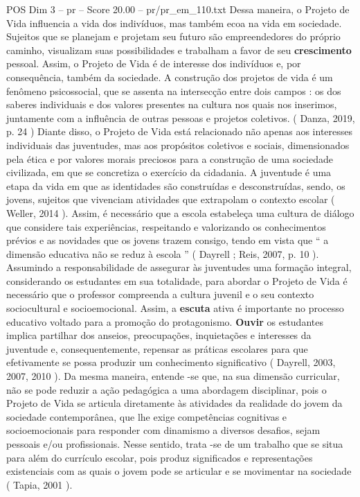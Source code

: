 \begin{textsample}{POS Dim 3 – pr – Score 20.00 – pr/pr\_em\_110.txt}
Dessa maneira, o Projeto de Vida influencia a vida dos indivíduos, mas também ecoa na vida em sociedade.
Sujeitos que se planejam e projetam seu futuro são empreendedores do próprio caminho, visualizam suas possibilidades e trabalham a favor de seu \textbf{crescimento} pessoal.
Assim, o Projeto de Vida é de interesse dos indivíduos e, por consequência, também da sociedade.
A construção dos projetos de vida é um fenômeno psicossocial, que se assenta na intersecção entre dois campos : os dos saberes individuais e dos valores presentes na cultura nos quais nos inserimos, juntamente com a influência de outras pessoas e projetos coletivos. ( Danza, 2019, p. 24 ) Diante disso, o Projeto de Vida está relacionado não apenas aos interesses individuais das juventudes, mas aos propósitos coletivos e sociais, dimensionados pela ética e por valores morais preciosos para a construção de uma sociedade civilizada, em que se concretiza o exercício da cidadania.
A juventude é uma etapa da vida em que as identidades são construídas e desconstruídas, sendo, os jovens, sujeitos que vivenciam atividades que extrapolam o contexto escolar ( Weller, 2014 ).
Assim, é necessário que a escola estabeleça uma cultura de diálogo que considere tais experiências, respeitando e valorizando os conhecimentos prévios e as novidades que os jovens trazem consigo, tendo em vista que “ a dimensão educativa não se reduz à escola ” ( Dayrell ; Reis, 2007, p. 10 ).
Assumindo a responsabilidade de assegurar às juventudes uma formação integral, considerando os estudantes em sua totalidade, para abordar o Projeto de Vida é necessário que o professor compreenda a cultura juvenil e o seu contexto sociocultural e socioemocional.
Assim, a \textbf{escuta} ativa é importante no processo educativo voltado para a promoção do protagonismo. \textbf{Ouvir} os estudantes implica partilhar dos anseios, preocupações, inquietações e interesses da juventude e, consequentemente, repensar as práticas escolares para que efetivamente se possa produzir um conhecimento significativo ( Dayrell, 2003, 2007, 2010 ).
Da mesma maneira, entende -se que, na sua dimensão curricular, não se pode reduzir a ação pedagógica a uma abordagem disciplinar, pois o Projeto de Vida se articula diretamente às atividades da realidade do jovem da sociedade contemporânea, que lhe exige competências cognitivas e socioemocionais para responder com dinamismo a diversos desafios, sejam pessoais e/ou profissionais.
Nesse sentido, trata -se de um trabalho que se situa para além do currículo escolar, pois produz significados e representações existenciais com as quais o jovem pode se articular e se movimentar na sociedade ( Tapia, 2001 ).

\end{textsample}
